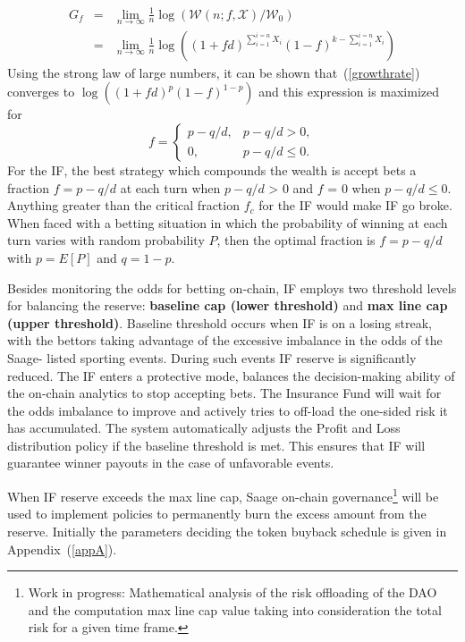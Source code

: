 \documentclass[%
 aapm,
 mph,%
 amsmath,amssymb,
 reprint,%
]{revtex4-2}
\begin{document}
\begin{eqnarray}
G_f &=& \lim_{n\rightarrow \infty} \frac{1}{n} \log(\mathcal{W}(n; f, \mathcal{X})/\mathcal{W}_0) \nonumber\\
& = & \lim_{n\rightarrow \infty}\frac{1}{n} \log( (1 + f d)^{\sum_{i=1}^{i=n} X_i} (1 - f)^{k - \sum_{i=1}^{i=n} X_i})
\label{growthrate}
\end{eqnarray}
Using the strong law of large numbers, it can be shown that~(\ref{growthrate}) converges to $\log((1 + f d)^p (1 - f)^{1 - p} )$ and this expression is maximized for 
\begin{equation}
f = \left\{
\begin{array}{ll}
p - q/d , & p - q/d > 0, \\[2pt]
0, & p - q/d \leq 0.
\end{array} \right.
\label{optbetfraction}
\end{equation}
For the IF, the best strategy which compounds the wealth is accept bets a fraction $f = p - q/d$ at each turn when $p - q/d$ > 0 and $f$ = 0 when $p - q/d \leq 0$. Anything greater than the critical fraction $f_c$ for the IF would make IF go broke. When faced with a betting situation in which the probability of winning at each turn varies with random probability $P$, then the optimal fraction is $f = p - q/d$ with $p = E[ P ]$ and $q = 1 - p$. 

Besides monitoring the odds for betting on-chain, IF employs two threshold levels for balancing the reserve: \textbf{baseline cap (lower threshold)} and \textbf{max line cap (upper threshold)}. Baseline threshold occurs when IF is on a losing streak, with the bettors taking advantage of the excessive imbalance in the odds of the Saage- listed sporting events. During such events IF reserve is significantly reduced. The IF enters a protective mode, balances the decision-making ability of the on-chain analytics to stop accepting bets. The Insurance Fund will wait for the odds imbalance to improve and actively tries to off-load the one-sided risk it has accumulated. The system automatically adjusts the Profit and Loss distribution policy if the baseline threshold is met. This ensures that IF  will guarantee winner payouts in the case of unfavorable events. 

When IF reserve exceeds the max line cap, Saage on-chain governance\footnote{Work in progress: Mathematical analysis of the risk offloading of the DAO and the computation max line cap value taking into consideration the total risk for a given time frame.} will be used to implement policies to permanently burn the excess amount from the reserve. Initially the parameters deciding the token buyback schedule is given in Appendix~(\ref{appA}). 
\end{document}
